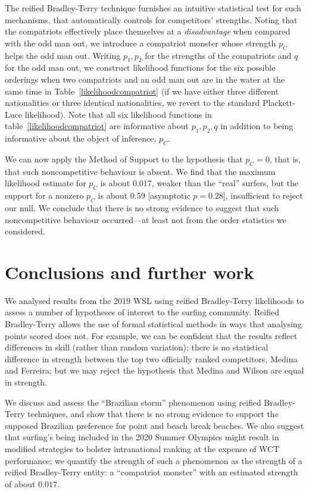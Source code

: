 \documentclass{article}
\begin{document}
The reified Bradley-Terry technique furnishes an intuitive statistical
test for such mechanisms, that automatically controls for competitors'
strengths.  Noting that the compatriots effectively place themselves
at a {\em disadvantage} when compared with the odd man out, we
introduce a compatriot monster whose strength $p_C$ helps the odd man
out.  Writing $p_1, p_2$ for the strengths of the compatriots and $q$
for the odd man out, we construct likelihood functions for the six
possible orderings when two compatriots and an odd man out are in the
water at the same time in Table~\ref{likelihoodcompatriot} (if we have
either three different nationalities or three identical nationalities,
we revert to the standard Plackett-Luce likelihood).  Note that all
six likelihood functions in table~\ref{likelihoodcompatriot} are
informative about $p_1,p_2,q$ in addition to being informative about
the object of inference, $p_C$.

We can now apply the Method of Support to the hypothesis that $p_C=0$,
that is, that such noncompetitive behaviour is absent.  We find that
the maximum likelihood estimate for $p_C$ is about 0.017, weaker than
the ``real'' surfers, but the support for a nonzero $p_C$ is about
0.59 [asymptotic $p=0.28$], insufficient to reject our null.  We
conclude that there is no strong evidence to suggest that such
noncompetitive behaviour occurred---at least not from the order
statistics we considered.

\section{Conclusions and further work}

We analysed results from the 2019 WSL using reified
Bradley-Terry likelihoods to assess a number of hypotheses of interest
to the surfing community.  Reified Bradley-Terry allows the use of
formal statistical methods in ways that analysing points scored does
not.  For example, we can be confident that the results reflect
differences in skill (rather than random variation); there is no
statistical difference in strength between the top two officially
ranked competitors, Medina and Ferreira; but we may reject the
hypothesis that Medina and Wilson are equal in strength.

We discuss and assess the ``Brazilian storm'' phenomenon using reified
Bradley-Terry techniques, and show that there is no strong evidence to
support the supposed Brazilian preference for point and beach break
beaches.  We also suggest that surfing's being included in the 2020
Summer Olympics might result in modified strategies to bolster
intranational ranking at the expense of WCT performance; we quantify
the strength of such a phenomenon as the strength of a reified
Bradley-Terry entity: a ``compatriot monster'' with an estimated
strength of about $0.017$.
\end{document}
